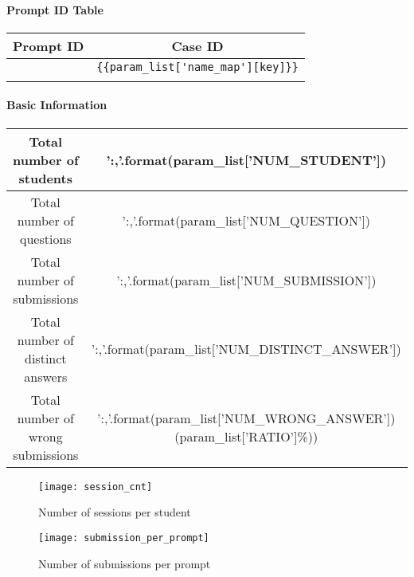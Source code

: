 \documentclass[12pt]{article} %
\begin{document}
\setlength{\pdfpageheight}{\paperheight}
\setlength{\pdfpagewidth}{\paperwidth}
\setlength{\parindent}{0pt} %
\setlength{\parskip}{2ex} %

\paragraph{Prompt ID Table}
\begin{center}
	\begin{tabular}{cc}
		Prompt ID & Case ID \\\toprule
		{%
		{{key}} & \verb|{{param_list['name_map'][key]}}| \\\midrule
		{%
	\end{tabular}
\end{center}

\paragraph{Basic Information}
\begin{center}
	\begin{tabular}{cc}
		\toprule
		Total number of students & {{'{:,}'.format(param_list['NUM_STUDENT'])}} \\\midrule
		Total number of questions & {{'{:,}'.format(param_list['NUM_QUESTION'])}} \\\midrule
		Total number of submissions & {{'{:,}'.format(param_list['NUM_SUBMISSION'])}} \\\midrule
		Total number of distinct answers & {{'{:,}'.format(param_list['NUM_DISTINCT_ANSWER'])}} \\\midrule
		Total number of wrong submissions & {{'{:,}'.format(param_list['NUM_WRONG_ANSWER'])}}({{param_list['RATIO']}}\%)) \\\bottomrule
	\end{tabular}
\end{center}

\begin{figure}[!ht]
	\centering
	\texttt{[image: session\_cnt]}
	\caption{Number of sessions per student}
\end{figure}

\begin{figure}[!ht]
	\centering
	\texttt{[image: submission\_per\_prompt]}
	\caption{Number of submissions per prompt}
\end{figure}
\end{document}
